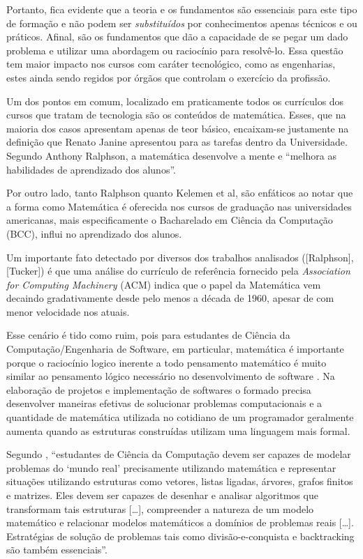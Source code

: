 \documentclass[conference]{IEEEtran}
\begin{document}
	Portanto, fica evidente que a teoria e os fundamentos são essenciais para este tipo de formação e não podem ser \emph{substituídos} por conhecimentos apenas técnicos e ou práticos. Afinal, são os fundamentos que dão a capacidade de se pegar um dado problema e utilizar uma abordagem ou raciocínio para resolvê-lo. Essa questão tem maior impacto nos cursos com caráter tecnológico, como as engenharias, estes ainda sendo regidos por órgãos que controlam o exercício da profissão. 

	Um dos pontos em comum, localizado em praticamente todos os currículos dos cursos que tratam de tecnologia são os conteúdos de matemática. Esses, que na maioria dos casos  apresentam apenas de teor básico, encaixam-se justamente na definição que Renato Janine apresentou para as tarefas dentro da Universidade. Segundo Anthony Ralphson, a matemática desenvolve a mente e ``melhora as habilidades de aprendizado dos alunos''.

	Por outro lado, tanto Ralphson quanto Kelemen et al, são enfáticos ao notar que a forma como Matemática é oferecida nos cursos de graduação nas universidades americanas, mais especificamente o Bacharelado em Ciência da Computação (BCC), influi no aprendizado dos alunos. 

	Um importante fato detectado por diversos dos trabalhos analisados ([Ralphson], [Tucker]) é que uma análise do currículo de referência fornecido pela \emph{Association for Computing Machinery} (ACM) indica que o papel da Matemática vem decaindo gradativamente desde pelo menos a década de 1960, apesar de com menor velocidade nos      atuais.

	Esse cenário é tido como ruim, pois para estudantes de Ciência da Computação/Engenharia de Software, em particular, matemática é importante porque o raciocínio logico inerente a todo pensamento matemático é muito similar ao pensamento lógico necessário no desenvolvimento de software \cite{ralston:do_need_mathematics}. Na elaboração de projetos e implementação de softwares o formado precisa desenvolver maneiras efetivas de solucionar problemas computacionais e a quantidade de matemática utilizada no cotidiano de um programador geralmente aumenta quando as estruturas construídas utilizam uma linguagem mais formal. \cite{ralston:do_need_mathematics}

	Segundo \cite{kelemen:has_become_math_phobic}, ``estudantes de Ciência da Computação devem ser capazes de modelar problemas do `mundo real' precisamente utilizando matemática e representar situações utilizando estruturas como vetores, listas ligadas, árvores, grafos finitos e matrizes. Eles devem ser capazes de desenhar e analisar algoritmos que transformam tais estruturas [\ldots], compreender a natureza de um modelo matemático e relacionar modelos matemáticos a domínios de problemas reais [\ldots]. Estratégias de solução de problemas tais como divisão-e-conquista e backtracking são também essenciais''.
\end{document}

